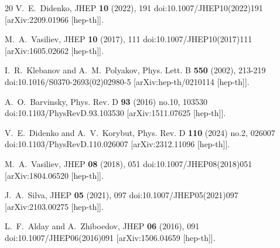 \documentclass[12pt]{article}
\begin{document}
\begin{thebibliography}{20}
V.~E.~Didenko,
JHEP \textbf{10} (2022), 191
doi:10.1007/JHEP10(2022)191
[arXiv:2209.01966 [hep-th]].

M.~A.~Vasiliev,
JHEP \textbf{10} (2017), 111
doi:10.1007/JHEP10(2017)111
[arXiv:1605.02662 [hep-th]].

I.~R.~Klebanov and A.~M.~Polyakov,
Phys. Lett. B \textbf{550} (2002), 213-219
doi:10.1016/S0370-2693(02)02980-5
[arXiv:hep-th/0210114 [hep-th]].

A.~O.~Barvinsky,
Phys. Rev. D \textbf{93} (2016) no.10, 103530
doi:10.1103/PhysRevD.93.103530
[arXiv:1511.07625 [hep-th]].

V.~E.~Didenko and A.~V.~Korybut,
Phys. Rev. D \textbf{110} (2024) no.2, 026007
doi:10.1103/PhysRevD.110.026007
[arXiv:2312.11096 [hep-th]].

M.~A.~Vasiliev,
JHEP \textbf{08} (2018), 051
doi:10.1007/JHEP08(2018)051
[arXiv:1804.06520 [hep-th]].

J.~A.~Silva,
JHEP \textbf{05} (2021), 097
doi:10.1007/JHEP05(2021)097
[arXiv:2103.00275 [hep-th]].

L.~F.~Alday and A.~Zhiboedov,
JHEP \textbf{06} (2016), 091
doi:10.1007/JHEP06(2016)091
[arXiv:1506.04659 [hep-th]].


\end{thebibliography}
\end{document}
